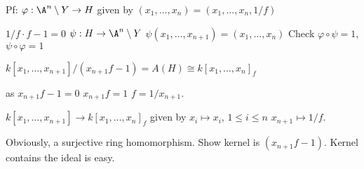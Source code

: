 Pf: $\varphi: \A^n \setminus Y \to H$ given by $(x_1,\ldots,x_n)= (x_1,\ldots,x_n,1/f)$

$1/f \cdot f-1=0$
$\psi: H \to \A^n \setminus Y$
$\psi(x_1,\ldots,x_{n+1})= (x_1,\ldots,x_n)$
Check $\varphi \circ \psi= 1$, $\psi \circ \varphi= 1$

$k[x_1,\ldots,x_{n+1}]/(x_{n+1}f-1) = A(H) \cong k[x_1,\ldots,x_n]_f$

as 
$x_{n+1}f-1=0$
$x_{n+1}f=1$
$f= 1/x_{n+1}$. 


$k[x_1,\ldots,x_{n+1}] \to k[x_1,\ldots,x_n]_f$
given by $x_i \mapsto x_i$, $1 \leq i \leq n$
$x_{n+1} \mapsto 1/f$.

Obviously, a surjective ring homomorphism. Show kernel is $(x_{n+1}f-1)$. Kernel contains the ideal is easy. 



























